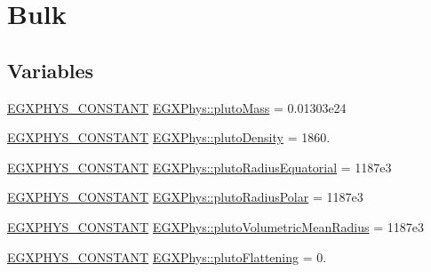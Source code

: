 \hypertarget{group___e_g_x_phys-_constants-_astrophysics-_solar_system-_pluto-_bulk}{}\section{Bulk}
\label{group___e_g_x_phys-_constants-_astrophysics-_solar_system-_pluto-_bulk}
\subsection*{Variables}
\begin{DoxyCompactItemize}
\item 
\mbox{\hyperlink{group___e_g_x_phys-_constants-_macros_ga76980d288494ce1714c9ac68a95ba702}{E\+G\+X\+P\+H\+Y\+S\+\_\+\+C\+O\+N\+S\+T\+A\+NT}} \mbox{\hyperlink{group___e_g_x_phys-_constants-_astrophysics-_solar_system-_pluto-_bulk_ga64b5fe1eec8bbe847b7d69ec64f471af}{E\+G\+X\+Phys\+::pluto\+Mass}} = 0.\+01303e24
\item 
\mbox{\hyperlink{group___e_g_x_phys-_constants-_macros_ga76980d288494ce1714c9ac68a95ba702}{E\+G\+X\+P\+H\+Y\+S\+\_\+\+C\+O\+N\+S\+T\+A\+NT}} \mbox{\hyperlink{group___e_g_x_phys-_constants-_astrophysics-_solar_system-_pluto-_bulk_ga299c62200c1c928f7826dfad0bb401b8}{E\+G\+X\+Phys\+::pluto\+Density}} = 1860.
\item 
\mbox{\hyperlink{group___e_g_x_phys-_constants-_macros_ga76980d288494ce1714c9ac68a95ba702}{E\+G\+X\+P\+H\+Y\+S\+\_\+\+C\+O\+N\+S\+T\+A\+NT}} \mbox{\hyperlink{group___e_g_x_phys-_constants-_astrophysics-_solar_system-_pluto-_bulk_gaf4f1a1a2beece69e57a7e7e81e20d732}{E\+G\+X\+Phys\+::pluto\+Radius\+Equatorial}} = 1187e3
\item 
\mbox{\hyperlink{group___e_g_x_phys-_constants-_macros_ga76980d288494ce1714c9ac68a95ba702}{E\+G\+X\+P\+H\+Y\+S\+\_\+\+C\+O\+N\+S\+T\+A\+NT}} \mbox{\hyperlink{group___e_g_x_phys-_constants-_astrophysics-_solar_system-_pluto-_bulk_gadefd01a34e2911eb76f9e42c4878669a}{E\+G\+X\+Phys\+::pluto\+Radius\+Polar}} = 1187e3
\item 
\mbox{\hyperlink{group___e_g_x_phys-_constants-_macros_ga76980d288494ce1714c9ac68a95ba702}{E\+G\+X\+P\+H\+Y\+S\+\_\+\+C\+O\+N\+S\+T\+A\+NT}} \mbox{\hyperlink{group___e_g_x_phys-_constants-_astrophysics-_solar_system-_pluto-_bulk_gad9e756e24608ecdfcf0dd0b21edf00f0}{E\+G\+X\+Phys\+::pluto\+Volumetric\+Mean\+Radius}} = 1187e3
\item 
\mbox{\hyperlink{group___e_g_x_phys-_constants-_macros_ga76980d288494ce1714c9ac68a95ba702}{E\+G\+X\+P\+H\+Y\+S\+\_\+\+C\+O\+N\+S\+T\+A\+NT}} \mbox{\hyperlink{group___e_g_x_phys-_constants-_astrophysics-_solar_system-_pluto-_bulk_gae2455ed57bcf053b7b3e8b057d190604}{E\+G\+X\+Phys\+::pluto\+Flattening}} = 0.

\end{DoxyCompactItemize}
